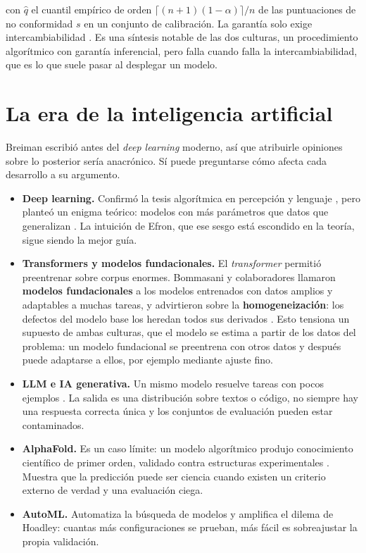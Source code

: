 \documentclass[11pt,a4paper]{article}
\providecommand{\tightlist}{\setlength{\itemsep}{0pt}\setlength{\parskip}{0pt}}
\begin{document}
con \(\hat q\) el cuantil empírico de orden \(\lceil (n+1)(1-\alpha) \rceil / n\) de las puntuaciones de no conformidad \(s\) en un conjunto de calibración. La garantía solo exige intercambiabilidad \autocite{angelopoulos2023}. Es una síntesis notable de las dos culturas, un procedimiento algorítmico con garantía inferencial, pero falla cuando falla la intercambiabilidad, que es lo que suele pasar al desplegar un modelo.

\section{La era de la inteligencia artificial}\label{sec-ia}

Breiman escribió antes del \emph{deep learning} moderno, así que atribuirle opiniones sobre lo posterior sería anacrónico. Sí puede preguntarse cómo afecta cada desarrollo a su argumento.

\begin{itemize}
\tightlist
\item
  \textbf{Deep learning.} Confirmó la tesis algorítmica en percepción y lenguaje \autocite{lecun2015}, pero planteó un enigma teórico: modelos con más parámetros que datos que generalizan \autocite{zhang2017,belkin2019}. La intuición de Efron, que ese sesgo está escondido en la teoría, sigue siendo la mejor guía.
\item
  \textbf{Transformers y modelos fundacionales.} El \emph{transformer} \autocite{vaswani2017} permitió preentrenar sobre corpus enormes. Bommasani y colaboradores llamaron \textbf{modelos fundacionales} a los modelos entrenados con datos amplios y adaptables a muchas tareas, y advirtieron sobre la \textbf{homogeneización}: los defectos del modelo base los heredan todos sus derivados \autocite{bommasani2021}. Esto tensiona un supuesto de ambas culturas, que el modelo se estima a partir de los datos del problema: un modelo fundacional se preentrena con otros datos y después puede adaptarse a ellos, por ejemplo mediante ajuste fino.
\item
  \textbf{LLM e IA generativa.} Un mismo modelo resuelve tareas con pocos ejemplos \autocite{brown2020}. La salida es una distribución sobre textos o código, no siempre hay una respuesta correcta única y los conjuntos de evaluación pueden estar contaminados.
\item
  \textbf{AlphaFold.} Es un caso límite: un modelo algorítmico produjo conocimiento científico de primer orden, validado contra estructuras experimentales \autocite{jumper2021}. Muestra que la predicción puede ser ciencia cuando existen un criterio externo de verdad y una evaluación ciega.
\item
  \textbf{AutoML.} Automatiza la búsqueda de modelos \autocite{hutter2019} y amplifica el dilema de Hoadley: cuantas más configuraciones se prueban, más fácil es sobreajustar la propia validación.
\end{itemize}
\end{document}
